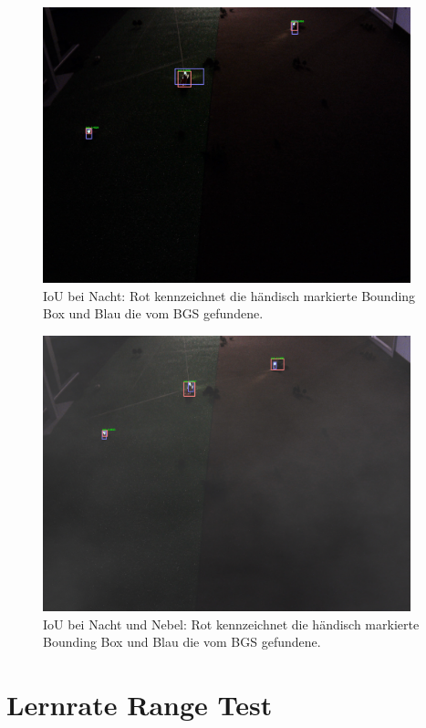 \begin{figure}[H]
    \centering
    \includegraphics[width=0.95\textwidth]{figures/appendix/bgs_iou_1}
    \caption[IoU bei Nacht]{IoU bei Nacht: Rot kennzeichnet die händisch markierte Bounding Box und Blau die vom \ac{BGS} gefundene.}
    \label{fig:apx:bgs_iou_1}
\end{figure}
\begin{figure}[H]
    \centering
    \includegraphics[width=0.95\textwidth]{figures/appendix/bgs_iou_2}
    \caption[IoU bei Nacht und Nebel]{IoU bei Nacht und Nebel: Rot kennzeichnet die händisch markierte Bounding Box und Blau die vom \ac{BGS} gefundene.}
    \label{fig:apx:bgs_iou_2}
\end{figure}

\section{Lernrate Range Test} \label{apx:lr_rangetest}

